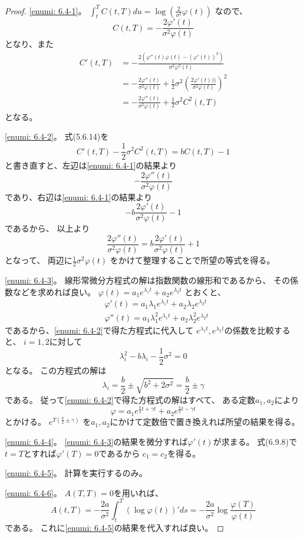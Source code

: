 \documentclass[uplatex]{jsarticle}
\theoremstyle{definition}
\begin{document}
\begin{proof}
  \ref{enumi: 6.4-1}。
  \(\int_t^TC(t,T)du = \log\left( \frac{2}{\sigma^2}\varphi(t)\right)\)
  なので、
  \[
  C(t,T) = - \frac{2\varphi'(t)}{\sigma^2\varphi(t)}
  \]
  となり、また
  \begin{align*}
    C'(t,T)
    &= - \frac{2\left( \varphi''(t)\varphi(t) - (\varphi'(t))^2\right)}
    {\sigma^2\varphi^2(t)} \\
    &= - \frac{2\varphi''(t)}{\sigma^2\varphi(t)}
    + \frac{1}{2}\sigma^2\left(
    \frac{2\varphi'(t)))}{\sigma^2\varphi(t)} \right)^2 \\
    &= - \frac{2\varphi''(t)}{\sigma^2\varphi(t)}
    + \frac{1}{2}\sigma^2C^2(t,T)
  \end{align*}
  となる。

  \ref{enumi: 6.4-2}。
  式(5.6.14)を
  \[
  C'(t,T) - \frac{1}{2}\sigma^2C^2(t,T) = bC(t,T) - 1
  \]
  と書き直すと、左辺は\ref{enumi: 6.4-1}の結果より
  \[
  - \frac{2\varphi''(t)}{\sigma^2\varphi(t)}
  \]
  であり、右辺は\ref{enumi: 6.4-1}の結果より
  \[
  - b\frac{2\varphi'(t)}{\sigma^2\varphi(t)} - 1
  \]
  であるから、
  以上より
  \[
  \frac{2\varphi''(t)}{\sigma^2\varphi(t)}
  = b\frac{2\varphi'(t)}{\sigma^2\varphi(t)} + 1
  \]
  となって、
  両辺に\(\frac{1}{2}\sigma^2\varphi(t)\)
  をかけて整理することで所望の等式を得る。

  \ref{enumi: 6.4-3}。
  線形常微分方程式の解は指数関数の線形和であるから、
  その係数などを求めれば良い。
  \(\varphi(t) = a_1e^{\lambda_1t} + a_2e^{\lambda_2t}\)
  とおくと、
  \begin{align*}
    &\varphi'(t)
    = a_1\lambda_1e^{\lambda_1t} + a_2\lambda_2e^{\lambda_2t}  \\
    &\varphi''(t)
    = a_1\lambda_1^2e^{\lambda_1t} + a_2\lambda_2^2e^{\lambda_2t}
  \end{align*}
  であるから、\ref{enumi: 6.4-2}で得た方程式に代入して
  \(e^{\lambda_1t},e^{\lambda_2t}\)の係数を比較すると、
  \(i=1,2\)に対して
  \[
  \lambda_i^2 - b\lambda_i - \frac{1}{2}\sigma^2 = 0
  \]
  となる。
  この方程式の解は
  \[
  \lambda_i
  = \frac{b}{2} \pm \sqrt{b^2+2\sigma^2}
  = \frac{b}{2} \pm \gamma
  \]
  である。
  従って\ref{enumi: 6.4-2}で得た方程式の解はすべて、
  ある定数\(a_1,a_2\)により
  \[
  \varphi = a_1e^{\frac{b}{2}t + \gamma t}
  + a_2e^{\frac{b}{2}t - \gamma t}
  \]
  とかける。
  \(e^{T\left( \frac{b}{2} \pm \gamma \right)}\)
  を\(a_1,a_2\)にかけて定数倍で置き換えれば所望の結果を得る。

  \ref{enumi: 6.4-4}。
  \ref{enumi: 6.4-3}の結果を微分すれば\(\varphi'(t)\)が求まる。
  式(6.9.8)で\(t=T\)とすれば\(\varphi'(T)=0\)であるから
  \(c_1=c_2\)を得る。

  \ref{enumi: 6.4-5}。
  計算を実行するのみ。

  \ref{enumi: 6.4-6}。
  \(A(T,T)=0\)を用いれば、
  \[
  A(t,T) = -\frac{2a}{\sigma^2}
  \int_t^T \left( \log\varphi(t) \right)' ds
  = -\frac{2a}{\sigma^2}\log\frac{\varphi(T)}{\varphi(t)}
  \]
  である。
  これに\ref{enumi: 6.4-5}の結果を代入すれば良い。
\end{proof}
\end{document}
